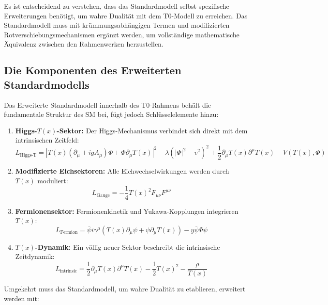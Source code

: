 \documentclass[12pt,a4paper]{article}
\newcommand{\Tfield}{T(x)}
\begin{document}
	Es ist entscheidend zu verstehen, dass das Standardmodell selbst spezifische Erweiterungen benötigt, um wahre Dualität mit dem T0-Modell zu erreichen. Das Standardmodell muss mit krümmungsabhängigen Termen und modifizierten Rotverschiebungsmechanismen ergänzt werden, um vollständige mathematische Äquivalenz zwischen den Rahmenwerken herzustellen.
	
	\subsection{Die Komponenten des Erweiterten Standardmodells}
	
	Das Erweiterte Standardmodell innerhalb des T0-Rahmens behält die fundamentale Struktur des SM bei, fügt jedoch Schlüsselelemente hinzu:
	
	\begin{enumerate}
		\item \textbf{Higgs-$\Tfield$-Sektor:} Der Higgs-Mechanismus verbindet sich direkt mit dem intrinsischen Zeitfeld:
		\begin{equation}
			L_{\text{Higgs-T}} = |\Tfield (\partial_{\mu} + ig A_{\mu}) \Phi + \Phi \partial_{\mu} \Tfield|^2 - \lambda (|\Phi|^2 - v^2)^2 + \frac{1}{2} \partial_{\mu} \Tfield \partial^{\mu} \Tfield - V(\Tfield, \Phi)
		\end{equation}
		\item \textbf{Modifizierte Eichsektoren:} Alle Eichwechselwirkungen werden durch $\Tfield$ moduliert:
		\begin{equation}
			L_{\text{Gauge}} = -\frac{1}{4} \Tfield^2 F_{\mu\nu} F^{\mu\nu}
		\end{equation}
		\item \textbf{Fermionensektor:} Fermionenkinetik und Yukawa-Kopplungen integrieren $\Tfield$:
		\begin{equation}
			L_{\text{Fermion}} = \bar{\psi} i \gamma^{\mu} (\Tfield \partial_{\mu} \psi + \psi \partial_{\mu} \Tfield) - y \bar{\psi} \Phi \psi
		\end{equation}
		\item \textbf{$\Tfield$-Dynamik:} Ein völlig neuer Sektor beschreibt die intrinsische Zeitdynamik:
		\begin{equation}
			L_{\text{intrinsic}} = \frac{1}{2} \partial_{\mu} \Tfield \partial^{\mu} \Tfield - \frac{1}{2} \Tfield^2 - \frac{\rho}{\Tfield}
		\end{equation}
	\end{enumerate}
	
	Umgekehrt muss das Standardmodell, um wahre Dualität zu etablieren, erweitert werden mit:
	
\end{document}
